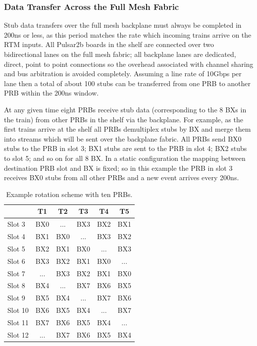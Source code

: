 \documentclass[letterpaper]{article}
\begin{document}
\subsubsection {Data Transfer Across the Full Mesh Fabric}

Stub data transfers over the full mesh backplane must always be completed in 200ns or less, as this period matches the rate which incoming trains arrive on the RTM inputs.  All Pulsar2b boards in the shelf are connected over two bidirectional lanes on the full mesh fabric; all backplane lanes are dedicated, direct, point to point connections so the overhead associated with channel sharing and bus arbitration is avoided completely.  Assuming a line rate of 10Gbps per lane then a total of about 100 stubs can be transferred from one PRB to another PRB within the 200ns window.

At any given time eight PRBs receive stub data (corresponding to the 8 BXs in the train) from other PRBs in the shelf via the backplane.  For example, as the first trains arrive at the shelf all PRBs demultiplex stubs by BX and merge them into streams which will be sent over the backplane fabric.  All PRBs send BX0 stubs to the PRB in slot 3; BX1 stubs are sent to the PRB in slot 4; BX2 stubs to slot 5; and so on for all 8 BX.  In a static configuration the mapping between destination PRB slot and BX is fixed; so in this example the PRB in slot 3 receives BX0 stubs from all other PRBs and a new event arrives every 200ns. 

\begin{table}
\centering
\caption{Example rotation scheme with ten PRBs.}
\label{rotation10table}
\begin{tabular}{|l|c|c|c|c|c|} \hline
        & T1  & T2  & T3  & T4  & T5  \\ \hline
Slot 3  & BX0 & ... & BX3 & BX2 & BX1 \\ \hline
Slot 4  & BX1 & BX0 & ... & BX3 & BX2 \\ \hline
Slot 5  & BX2 & BX1 & BX0 & ... & BX3 \\ \hline
Slot 6  & BX3 & BX2 & BX1 & BX0 & ... \\ \hline
Slot 7  & ... & BX3 & BX2 & BX1 & BX0 \\ \hline

Slot 8  & BX4 & ... & BX7 & BX6 & BX5 \\ \hline
Slot 9  & BX5 & BX4 & ... & BX7 & BX6 \\ \hline
Slot 10 & BX6 & BX5 & BX4 & ... & BX7 \\ \hline
Slot 11 & BX7 & BX6 & BX5 & BX4 & ... \\ \hline
Slot 12 & ... & BX7 & BX6 & BX5 & BX4 \\ \hline
\end{tabular}
\end{table}
\end{document}

